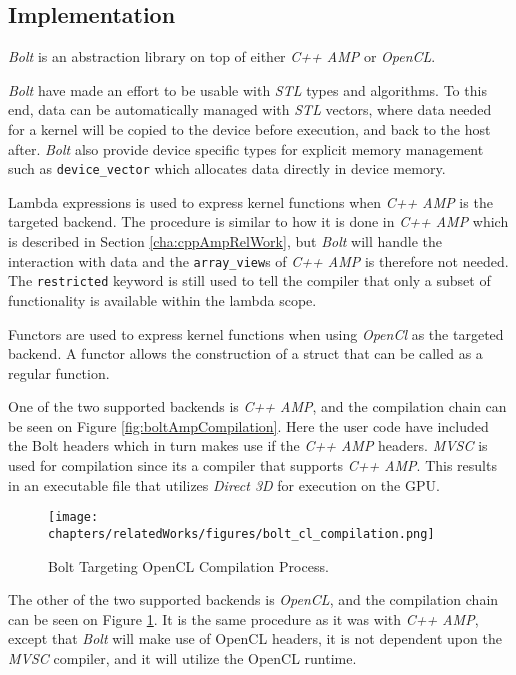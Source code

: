 \subsection{Implementation}
\textit{Bolt} is an abstraction library on top of either \textit{C++ AMP} or \textit{OpenCL}.  

\textit{Bolt} have made an effort to be usable with \textit{STL} types and algorithms. To this end, data can be automatically managed with \textit{STL} vectors, where data needed for a kernel will be copied to the device before execution, and back to the host after. \textit{Bolt} also provide device specific types for explicit memory management such as \texttt{device\_vector} which allocates data directly in device memory.

Lambda expressions is used to express kernel functions when \textit{C++ AMP} is the targeted backend. The procedure is similar to how it is done in \textit{C++ AMP} which is described in Section \ref{cha:cppAmpRelWork}, but \textit{Bolt} will handle the interaction with data and the \texttt{array\_view}s of \textit{C++ AMP} is therefore not needed. The \texttt{restricted} keyword is still used to tell the compiler that only a subset of functionality is available within the lambda scope.

Functors are used to express kernel functions when using \textit{OpenCl} as the targeted backend. A functor allows the construction of a struct that can be called as a regular function. 

One of the two supported backends is \textit{C++ AMP}, and the compilation chain can be seen on Figure \ref{fig:boltAmpCompilation}. Here the user code have included the Bolt headers which in turn makes use if the \textit{C++ AMP} headers. \textit{MVSC} is used for compilation since its a compiler that supports \textit{C++ AMP}. This results in an executable file that utilizes \textit{Direct 3D} for execution on the GPU.

\begin{figure}[H]
\center
\texttt{[image: chapters/relatedWorks/figures/bolt\_cl\_compilation.png]}
\caption{Bolt Targeting OpenCL Compilation Process.}
\label{fig:boltClCompilation}
\end{figure}

The other of the two supported backends is \textit{OpenCL}, and the compilation chain can be seen on Figure \ref{fig:boltClCompilation}. It is the same procedure as it was with \textit{C++ AMP}, except that \textit{Bolt} will make use of OpenCL headers, it is not dependent upon the \textit{MVSC} compiler, and it will utilize the OpenCL runtime.

